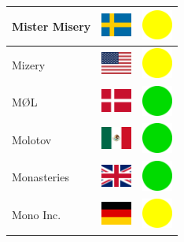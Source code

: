 \documentclass[12pt, a4paper, twoside]{report}
\begin{document}
\begin{center}
\begin{longtable}{|p{5cm}|p{2cm}|p{2cm}|}
Mister Misery & \includegraphics[width=1cm]{4x3/se} & \includegraphics[width=1cm]{likes/m} \\ \hline
Mizery & \includegraphics[width=1cm]{4x3/us} & \includegraphics[width=1cm]{likes/m} \\ \hline
MØL & \includegraphics[width=1cm]{4x3/dk} & \includegraphics[width=1cm]{likes/y} \\ \hline
Molotov & \includegraphics[width=1cm]{4x3/mx} & \includegraphics[width=1cm]{likes/y} \\ \hline
Monasteries & \includegraphics[width=1cm]{4x3/gb} & \includegraphics[width=1cm]{likes/y} \\ \hline
Mono Inc. & \includegraphics[width=1cm]{4x3/de} & \includegraphics[width=1cm]{likes/m} \\ \hline

\end{longtable}
\end{center}
\end{document}
